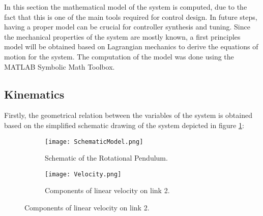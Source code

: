 \documentclass[main.tex]{subfiles}
\begin{document}
	
\vspace{20pt}
In this section the mathematical model of the system is computed, due to the fact that this is one of the main tools required for control design. In future steps, having a proper model can be crucial for controller synthesis and tuning. Since the mechanical properties of the system are mostly known, a first principles model will  be obtained based on Lagrangian mechanics to derive the equations of motion for the system. The computation of the model was done using the MATLAB\textsuperscript{\textregistered} Symbolic Math Toolbox\textsuperscript{\textregistered}.

\subsection{Kinematics}\label{kinematics}

Firstly, the geometrical relation between the variables of the system is obtained based on the simplified schematic drawing of the system depicted in figure \ref{fig:Schematic}:

\begin{figure}[H]
	\centering
	\begin{subfigure}[b]{0.4\textwidth}
		\texttt{[image: SchematicModel.png]}
\caption{\label{fig:Schematic} Schematic of the Rotational Pendulum.}
	\end{subfigure}
    \begin{subfigure}[b]{0.4\textwidth}
		\texttt{[image: Velocity.png]}
\caption{\label{fig:Velocity} Components of linear velocity on link 2.}
	\end{subfigure}
\end{figure}
\end{document}
